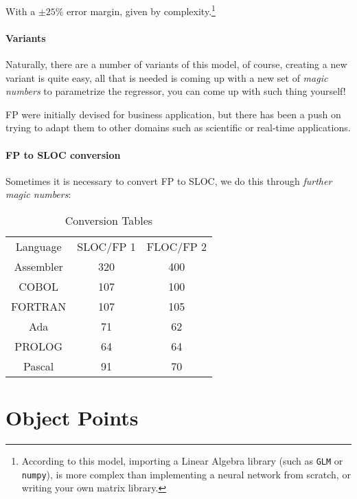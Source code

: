 \documentclass[openright, twoside, twocolumn, a4paper, 10pt]{report}
\begin{document}
With a $\pm 25\%$ error margin, given by complexity.\footnote{
	According to this model, importing a Linear Algebra library (such as \texttt{GLM} or \texttt{numpy}),
	is more complex than implementing a neural network from scratch, or writing your own matrix library.
}


\paragraph{Variants}
Naturally, there are a number of variants of this model, of course, creating a new variant is quite easy,
all that is needed is coming up with a new set of \emph{magic numbers} to parametrize the regressor,
you can come up with such thing yourself!

FP were initially devised for business application, but there has been a push on trying to adapt them
to other domains such as scientific or real-time applications.

\paragraph{FP to SLOC conversion}

Sometimes it is necessary to convert FP to SLOC, we do this through \emph{further magic numbers}:

\begin{table}[h!]
	\centering
	\begin{tabular}{c c c}
		\rowcolor{gray!50}
		Language  & SLOC/FP 1 & FLOC/FP 2 \\
		Assembler & 320       & 400       \\
		COBOL     & 107       & 100       \\
		FORTRAN   & 107       & 105       \\
		Ada       & 71        & 62        \\
		PROLOG    & 64        & 64        \\
		Pascal    & 91        & 70        \\
	\end{tabular}
	\caption{Conversion Tables}\label{tab:langs}
\end{table} %

\section{Object Points}
\end{document}
